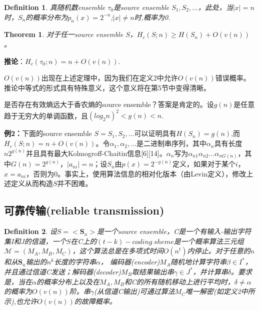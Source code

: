\documentclass[]{article}
\newtheorem{theorem}{Theorem}
\newtheorem{definition}{Definition}
\begin{document}
\begin{definition}
	真随机数ensemble $\tau_0$是source ensemble $S_1,S_2,\ldots$，此处，当$|x|=n$时，$S_n$的概率分布为$p_n(x)=2^{-n}$;$|x|\neq n$时,概率为0.
\end{definition}

\begin{theorem}
	对于任一source ensemble $S$，$H_c(S;n)\geq H(S_n)+O(v(n))$。
\end{theorem}


\vspace{0.5cm}
\textbf{推论}：$H_c(\tau_0;n)=n+O(v(n))$.
\vspace{0.5cm}



$O(v(n))$出现在上述定理中，因为我们在定义2中允许$O(v(n))$错误概率。推论中等式的形式具有特殊意义，这个意义将在第5节中变得清晰。

是否存在有效熵远大于香农熵的source ensemble？答案是肯定的。设$g(n)$是任意趋于无穷大的单调函数，且$(log_2 n)^2< g(n)<n$.

\textbf{例2：}下面的source ensemble $S=S_1,S_2,\ldots$可以证明具有$H(S_n)=g(n)$,而$H_c(S;n)=n+O(v(n))$。令$\alpha_1,\alpha_2,\ldots$是二进制串序列，其中$\alpha_n$具有长度$n2^{g(n)}$并且具有最大Kolmogroff-Chaitin信息[6][14]。$\alpha_n$写为$\alpha_{n1}\alpha_{n2}\ldots\alpha_{nG(n)}$，其中$G(n)=2^{g(n)}$，$|a_{ni}|=n$；设$S_n$由$p(x)=2^{-g(n)}$定义，如果对于某个$i$，$x=a_{ni}$，否则为0。事实上，使用算法信息的相对化版本（由Levin定义），修改上述定义从而构造$S$并不困难。

\subsection{可靠传输(reliable transmission)}


\begin{definition}
	设$S=<\textbf{S}_n>$是一个source ensemble，C是一个有输入-输出字符集I和J的信道，一个$S$在C上的$(t-k)-coding\ sheme$是一个概率算法三元组
	$\mathcal{M}=(M_A,M_B,M_C)$，这个算法总是在多项式时间$O(n^t)$内停止。对于任意的$n$和从$\textbf{S}_n$输出的$n^k$长度的字符串$\alpha$，
	编码器(encoder)$M_A$随机地计算字符串$\beta \in I^*$，并且通过信道C发送；解码器(decoder)$M_B$取结果输出串$\gamma \in J^*$，并计算串$\delta$。要求是，当在$\alpha$的概率分布上以及在$M_A,M_B$和C的所有随机移动上进行平均时，$\delta\neq \alpha$的概率为$O(v(n))$阶。串$\gamma$(从信道C输出)可通过算法$M_C$唯一解密(如定义2中所示),也允许$O(v(n))$的故障概率。
\end{definition}
\end{document}
